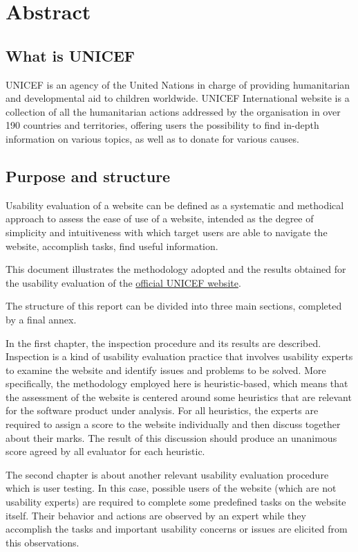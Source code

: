 
\section{Abstract}

\subsection{What is UNICEF}
UNICEF is an agency of the United Nations in charge of providing humanitarian and developmental aid to children worldwide. UNICEF International website is a collection of all the humanitarian actions addressed by the organisation in over 190 countries and territories, offering users the possibility to find in-depth information on various topics, as well as to donate for various causes.

\subsection{Purpose and structure}
Usability evaluation of a website can be defined as a systematic and methodical approach to assess the ease of use of a website, intended as the degree of simplicity and intuitiveness with which target users are able to navigate the website, accomplish tasks, find useful information.

This document illustrates the methodology adopted and the results obtained for the usability evaluation of the \href{https://www.unicef.org/}{official UNICEF website}.

The structure of this report can be divided into three main sections, completed by a final annex.

In the first chapter, the inspection procedure and its results are described. Inspection is a kind of usability evaluation practice that involves usability experts to examine the website and identify issues and problems to be solved. More specifically, the methodology employed here is heuristic-based, which means that the assessment of the website is centered around some heuristics that are relevant for the software product under analysis. 
For all heuristics, the experts are required to assign a score to the website individually and then discuss together about their marks. The result of this discussion should produce an unanimous score agreed by all evaluator for each heuristic.

The second chapter is about another relevant usability evaluation procedure which is user testing. In this case, possible users of the website (which are not usability experts) are required to complete some predefined tasks on the website itself. Their behavior and actions are observed by an expert while they accomplish the tasks and important usability concerns or issues are elicited from this observations.

